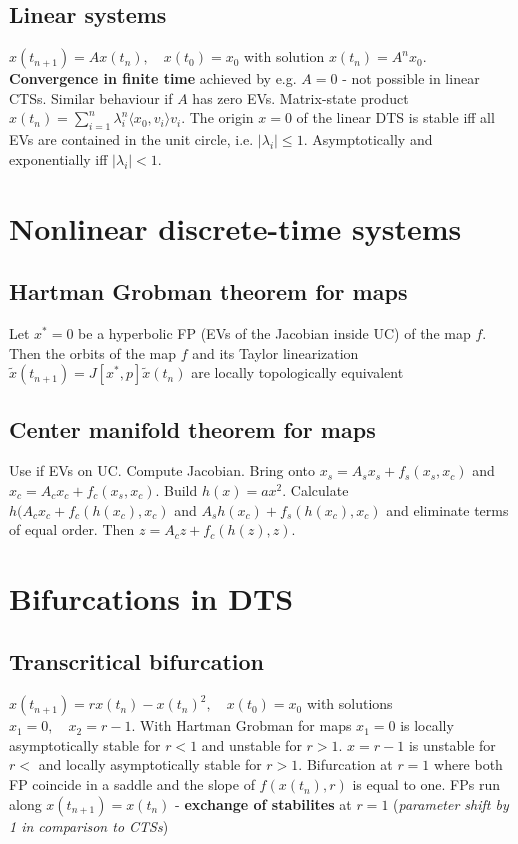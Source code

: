\subsection{Linear systems}
$x(t_{n+1})=Ax(t_n), \quad x(t_0)=x_0$ with solution $x(t_n)=A^nx_0$. \textbf{Convergence in finite time} achieved by e.g. $A=0$ - not possible in linear CTSs. Similar behaviour if $A$ has zero EVs. Matrix-state product $x(t_n)=\sum_{i=1}^n \lambda_i^n \langle x_0, v_i \rangle v_i$. The origin $x=0$ of the linear DTS is stable iff all EVs are contained in the unit circle, i.e. $|\lambda_i| \leq 1$. Asymptotically and exponentially iff $|\lambda_i|<1$.


\section{Nonlinear discrete-time systems}
\subsection{Hartman Grobman theorem for maps}
 Let $x^*= 0$ be a hyperbolic FP (EVs of the Jacobian inside UC) of the map $f$. Then the orbits of the map $f$ and its Taylor linearization $\tilde{x}(t_{n+1})=J[x^*,p]\tilde{x}(t_n)$ are locally topologically equivalent
\subsection{Center manifold theorem for maps}
Use if EVs on UC. Compute Jacobian. Bring onto $x_s=A_sx_s+f_s(x_s,x_c)$ and $x_c=A_cx_c+f_c(x_s,x_c)$. Build $h(x)=ax^2$. Calculate $h(A_cx_c+f_c(h(x_c),x_c)$ and $A_sh(x_c)+f_s(h(x_c),x_c)$ and eliminate terms of equal order. Then $z=A_cz+f_c(h(z),z)$.

\section{Bifurcations in DTS}
\subsection{Transcritical bifurcation}
$x(t_{n+1})= rx(t_n)-x(t_n)^2, \quad x(t_0)=x_0$ with solutions $x_1=0, \quad x_2=r-1$. With Hartman Grobman for maps $x_1=0$ is locally asymptotically stable for $r<1$ and unstable for $r>1$. $x=r-1$ is unstable for $r<$ and locally asymptotically stable for $r>1$. Bifurcation at $r=1$ where both FP coincide in a saddle and the slope of $f(x(t_n),r)$ is equal to one. FPs run along $x(t_{n+1})=x(t_n)$ - \textbf{exchange of stabilites} at $r=1$ (\emph{parameter shift by 1 in comparison to CTSs})
